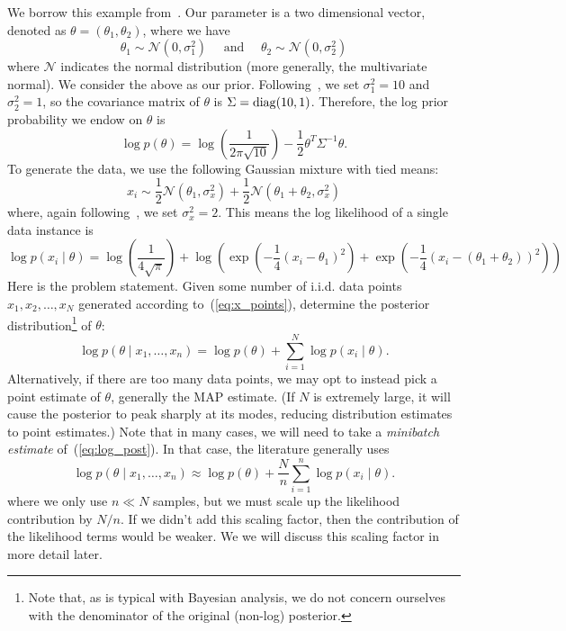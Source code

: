 \documentclass{article}
\begin{document}
We borrow this example from~\cite{langevin_2011}. Our parameter is a two dimensional vector, denoted
as $\theta = (\theta_1, \theta_2)$, where we have
\begin{equation}
\theta_1 \sim \mathcal{N}(0, \sigma_1^2) \quad \mbox{ and } \quad \theta_2 \sim \mathcal{N}(0, \sigma_2^2)
\end{equation}
where $\mathcal{N}$ indicates the normal distribution (more generally, the multivariate normal). We
consider the above as our prior. Following~\cite{langevin_2011}, we set $\sigma_1^2 = 10$ and
$\sigma_2^2=1$, so the covariance matrix of $\theta$ is $\Sigma = {\rm diag}(10,1)$. Therefore, the
log prior probability we endow on $\theta$ is
\begin{equation}
\log p(\theta) = \log \left(\frac{1}{2\pi\sqrt{10}}\right) - \frac{1}{2}\theta^T\Sigma^{-1}\theta.
\end{equation}
To generate the data, we use the following Gaussian mixture with tied means:
\begin{equation}\label{eq:x_points}
x_i \sim \frac{1}{2}\mathcal{N}(\theta_1, \sigma_x^2) + \frac{1}{2}\mathcal{N}(\theta_1+\theta_2, \sigma_x^2)
\end{equation}
where, again following~\cite{langevin_2011}, we set $\sigma_x^2 = 2$. This means the log likelihood
of a single data instance is
\begin{equation}
\log p(x_i \mid \theta) = \log\left(\frac{1}{4\sqrt{\pi}}\right) +
\log\left(\exp\left(-\frac{1}{4}(x_i - \theta_1)^2\right) + \exp\left(-\frac{1}{4}(x_i -
(\theta_1+\theta_2))^2\right)\right)
\end{equation}
Here is the problem statement. Given some number of i.i.d. data points $x_1, x_2, \ldots, x_N$
generated according to~(\ref{eq:x_points}), determine the posterior distribution\footnote{Note that,
as is typical with Bayesian analysis, we do not concern ourselves with the denominator of the
original (non-log) posterior.} of $\theta$:
\begin{equation}\label{eq:log_post}
\log p(\theta \mid x_1,\ldots,x_n) = \log p(\theta) + \sum_{i=1}^N\log p(x_i \mid \theta).
\end{equation}
Alternatively, if there are too many data points, we may opt to instead pick a point estimate of
$\theta$, generally the MAP estimate. (If $N$ is extremely large, it will cause the posterior to
peak sharply at its modes, reducing distribution estimates to point estimates.) Note that in many
cases, we will need to take a \emph{minibatch estimate} of~(\ref{eq:log_post}). In that case, the
literature generally uses
\begin{equation}\label{eq:scaling_factor}
\log p(\theta \mid x_1,\ldots,x_n) \approx \log p(\theta) + \frac{N}{n} \sum_{i=1}^n\log p(x_i \mid \theta).
\end{equation}
where we only use $n \ll N$ samples, but we must scale up the likelihood contribution by $N/n$. If we
didn't add this scaling factor, then the contribution of the likelihood terms would be weaker. We
we will discuss this scaling factor in more detail later.
\end{document}
